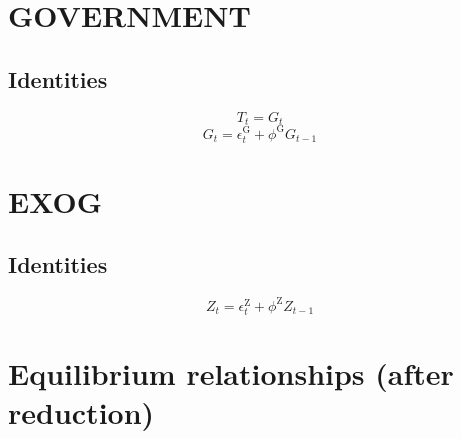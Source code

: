 \section{GOVERNMENT}

\subsection{Identities}

\begin{equation}
T_{t} = G_{t}
\end{equation}
\begin{equation}
G_{t} = \epsilon^{\mathrm{G}}_{t} + {\phi^{\mathrm{G}}} {G_{t-1}}
\end{equation}




\section{EXOG}

\subsection{Identities}

\begin{equation}
Z_{t} = \epsilon^{\mathrm{Z}}_{t} + {\phi^{\mathrm{Z}}} {Z_{t-1}}
\end{equation}




\section{Equilibrium relationships (after reduction)}

